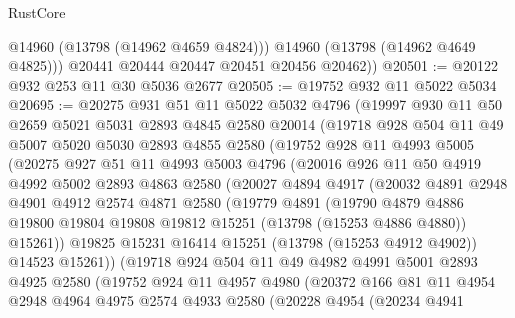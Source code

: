 \begin{lexlean}{RustCore}
\begin{coremodule}
            @14960
            (@13798 (@14962 @4659 @4824)))
          @14960
          (@13798 (@14962 @4649 @4825)))
        @20441
        @20444
        @20447
        @20451
        @20456
        @20462))
@20501 := @20122 @932 @253 @11 @30 @5036 @2677
@20505 := @19752 @932 @11 @5022 @5034
@20695 := @20275
    @931
    @51
    @11
    @5022
    @5032
    @4796
    (@19997
      @930
      @11
      @50
      @2659
      @5021
      @5031
      @2893
      @4845
      @2580
      @20014
      (@19718
        @928
        @504
        @11
        @49
        @5007
        @5020
        @5030
        @2893
        @4855
        @2580
        (@19752
          @928
          @11
          @4993
          @5005
          (@20275
            @927
            @51
            @11
            @4993
            @5003
            @4796
            (@20016
              @926
              @11
              @50
              @4919
              @4992
              @5002
              @2893
              @4863
              @2580
              (@20027
                @4894
                @4917
                (@20032
                  @4891
                  @2948
                  @4901
                  @4912
                  @2574
                  @4871
                  @2580
                  (@19779
                    @4891
                    (@19790
                      @4879
                      @4886
                      @19800
                      @19804
                      @19808
                      @19812
                      @15251
                      (@13798 (@15253 @4886 @4880))
                      @15261))
                  @19825
                  @15231
                  @16414
                  @15251
                  (@13798 (@15253 @4912 @4902))
                  @14523
                  @15261))
              (@19718
                @924
                @504
                @11
                @49
                @4982
                @4991
                @5001
                @2893
                @4925
                @2580
                (@19752
                  @924
                  @11
                  @4957
                  @4980
                  (@20372
                    @166
                    @81
                    @11
                    @4954
                    @2948
                    @4964
                    @4975
                    @2574
                    @4933
                    @2580
                    (@20228
                      @4954
                      (@20234
                        @4941

\end{coremodule}
\end{lexlean}
